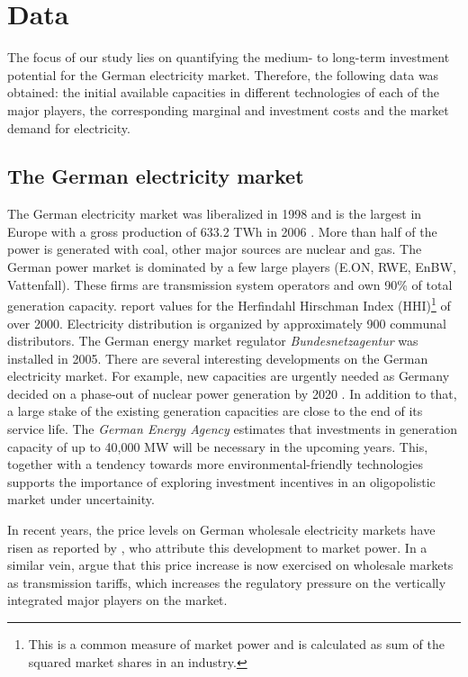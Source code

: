 \clearpage
\section{Data}\label{sec:germ-electr-mark}

The focus of our study lies on quantifying the medium- to long-term investment potential for the German electricity market. Therefore, the following data was obtained: the initial available capacities in different technologies of each of the major players, the corresponding marginal and investment costs and the market demand for electricity.

\subsection{The German electricity market}

The German electricity market was liberalized in 1998 and is the largest in Europe with a gross production of 633.2 TWh in 2006 \citep{IEA2007}. More than half of the power is generated with coal, other major sources are nuclear and gas. The German power market is dominated by a few large players (E.ON, RWE, EnBW, Vattenfall). These firms are transmission system operators and own 90\% of total generation capacity. \cite{Brunekreeft2006} report values for the Herfindahl Hirschman Index (HHI)\footnote{This is a common measure of market power and is calculated as sum of the squared market shares in an industry.} of over 2000. Electricity distribution is organized by approximately 900 communal distributors. The German energy market regulator  \emph{Bundesnetzagentur} was installed in 2005. There are several interesting developments on the German electricity market. For example, new capacities are urgently needed as Germany decided on a phase-out of nuclear power generation by 2020 \citep[see e.g.][]{IEA2007a}. In addition to that, a large stake of the existing generation capacities are close to the end of its service life. The \emph{German Energy Agency} estimates that investments in generation capacity of up to 40,000 MW will be necessary in the upcoming years. This, together with a tendency towards more environmental-friendly technologies supports the importance of exploring investment incentives in an oligopolistic market under uncertainity.
 
In recent years, the price levels on German wholesale electricity markets have risen as reported by \cite{Weigt2007}, who attribute this development to market power. In a similar vein, \cite{Brunekreeft2005} argue that this price increase is now exercised on wholesale markets as transmission tariffs, which increases the regulatory pressure on the vertically integrated major players on the market.

